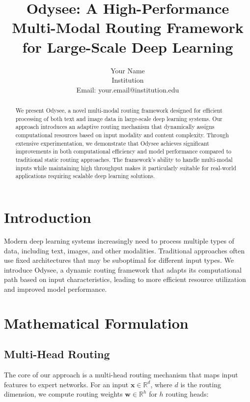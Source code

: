 \documentclass[10pt,journal,compsoc]{IEEEtran}
\begin{document}
\title{Odysee: A High-Performance Multi-Modal Routing Framework for Large-Scale Deep Learning}

\author{Your Name\\
Institution\\
Email: your.email@institution.edu
}

\maketitle

\begin{abstract}
We present Odysee, a novel multi-modal routing framework designed for efficient processing of both text and image data in large-scale deep learning systems. Our approach introduces an adaptive routing mechanism that dynamically assigns computational resources based on input modality and content complexity. Through extensive experimentation, we demonstrate that Odysee achieves significant improvements in both computational efficiency and model performance compared to traditional static routing approaches. The framework's ability to handle multi-modal inputs while maintaining high throughput makes it particularly suitable for real-world applications requiring scalable deep learning solutions.
\end{abstract}

\section{Introduction}
Modern deep learning systems increasingly need to process multiple types of data, including text, images, and other modalities. Traditional approaches often use fixed architectures that may be suboptimal for different input types. We introduce Odysee, a dynamic routing framework that adapts its computational path based on input characteristics, leading to more efficient resource utilization and improved model performance.

\section{Mathematical Formulation}

\subsection{Multi-Head Routing}
The core of our approach is a multi-head routing mechanism that maps input features to expert networks. For an input $\mathbf{x} \in \mathbb{R}^d$, where $d$ is the routing dimension, we compute routing weights $\mathbf{w} \in \mathbb{R}^h$ for $h$ routing heads:
\end{document}
